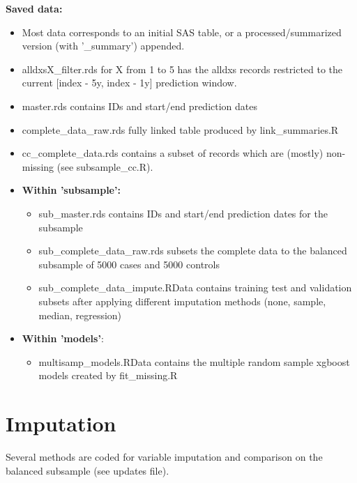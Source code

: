 \documentclass[12pt]{article}
\begin{document}
{\bf Saved data:}
\begin{itemize}
  \item Most data corresponds to an initial SAS table, or a processed/summarized version (with '\_summary') appended.
  \item alldxsX\_filter.rds for X from 1 to 5 has the alldxs records restricted to the current [index - 5y, index - 1y] prediction window.
  \item master.rds contains IDs and start/end prediction dates
  \item complete\_data\_raw.rds fully linked table produced by link\_summaries.R
  \item cc\_complete\_data.rds contains a subset of records which are (mostly) non-missing (see subsample\_cc.R).
  \item {\bf Within 'subsample':}
  \begin{itemize}
    \item sub\_master.rds contains IDs and start/end prediction dates for the subsample
    \item sub\_complete\_data\_raw.rds subsets the complete data to the balanced subsample of 5000 cases and 5000 controls
    \item sub\_complete\_data\_impute.RData contains training test and validation subsets after applying different imputation methods (none, sample, median, regression)
  \end{itemize}
  \item {\bf Within 'models'}:
  \begin{itemize}
    \item multisamp\_models.RData contains the multiple random sample xgboost models created by fit\_missing.R
  \end{itemize}
\end{itemize}

\section*{Imputation}

Several methods are coded for variable imputation and comparison on the balanced subsample (see updates file).
\end{document}
